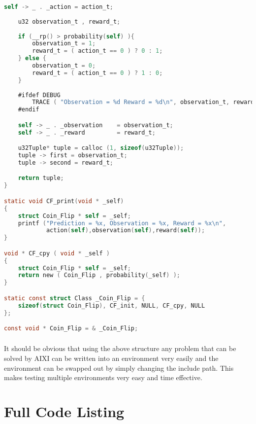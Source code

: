 \documentclass[fancychapters]{report}   	%
\begin{document}
\begin{lstlisting}[language=C,caption={coin_flip.c}]
    self -> _ . _action = action_t;
    
    u32 observation_t , reward_t;
    
    if (__rp() > probability(self) ){
        observation_t = 1;
        reward_t = ( action_t == 0 ) ? 0 : 1;
    } else {
        observation_t = 0;
        reward_t = ( action_t == 0 ) ? 1 : 0;
    }
    
    #ifdef DEBUG
        TRACE ( "Observation = %d Reward = %d\n", observation_t, reward_t );
    #endif

    self -> _ . _observation    = observation_t;
    self -> _ . _reward         = reward_t;

    u32Tuple* tuple = calloc (1, sizeof(u32Tuple));
    tuple -> first = observation_t;
    tuple -> second = reward_t;

    return tuple;
}

static void CF_print(void * _self)
{
    struct Coin_Flip * self = _self;
    printf ("Prediction = %x, Observation = %x, Reward = %x\n",
            action(self),observation(self),reward(self));
}

void * CF_cpy ( void * _self ) 
{
    struct Coin_Flip * self = _self;
    return new ( Coin_Flip , probability(_self) );
}

static const struct Class _Coin_Flip = {
    sizeof(struct Coin_Flip), CF_init, NULL, CF_cpy, NULL
};

const void * Coin_Flip = & _Coin_Flip;
\end{lstlisting}
\paragraph{} It should be obvious that using the above structure any problem that can be solved by AIXI can be written into an environment very easily and the environment can be swapped out by simply changing the include path.  This makes testing multiple environments very easy and time effective.

\chapter{Full Code Listing}
\end{document}
